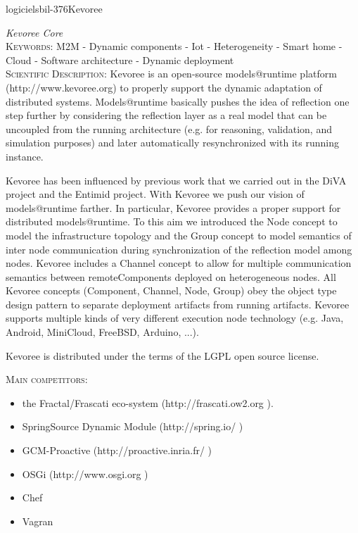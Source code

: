 \documentclass{ra2018}
\begin{document}
 \begin{module}{logiciels}{bil-376}{Kevoree}

 \textit{Kevoree Core} \\ 


   \textsc{Keywords:} M2M - Dynamic components - Iot - Heterogeneity - Smart home - Cloud - Software architecture - Dynamic deployment \\ 


    \textsc{Scientific Description:} Kevoree is an open-source models@runtime platform (http://www.kevoree.org) to properly support the dynamic adaptation of distributed systems. Models@runtime basically pushes the idea of reflection one step further by considering the reflection layer as a real model that can be uncoupled from the running architecture (e.g. for reasoning, validation, and simulation purposes) and later automatically resynchronized with its running instance.

Kevoree has been influenced by previous work that we carried out in the DiVA project and the Entimid project. With Kevoree we push our vision of models@runtime farther. In particular, Kevoree provides a proper support for distributed models@runtime. To this aim we introduced the Node concept to model the infrastructure topology and the Group concept to model semantics of inter node communication during synchronization of the reflection model among nodes. Kevoree includes a Channel concept to allow for multiple communication semantics between remoteComponents deployed on heterogeneous nodes. All Kevoree concepts (Component, Channel, Node, Group) obey the object type design pattern to separate deployment artifacts from running artifacts. Kevoree supports multiple kinds of very different execution node technology (e.g. Java, Android, MiniCloud, FreeBSD, Arduino, ...).

Kevoree is distributed under the terms of the LGPL open source license.

\textsc{Main competitors:}
\begin{itemize}
	\item the Fractal/Frascati eco-system (http://frascati.ow2.org ).
 	\item SpringSource Dynamic Module (http://spring.io/ )
 	\item GCM-Proactive (http://proactive.inria.fr/ )
 	\item OSGi (http://www.osgi.org )
 	\item Chef
 	\item Vagran
\end{itemize}



\end{module}
\end{document}

